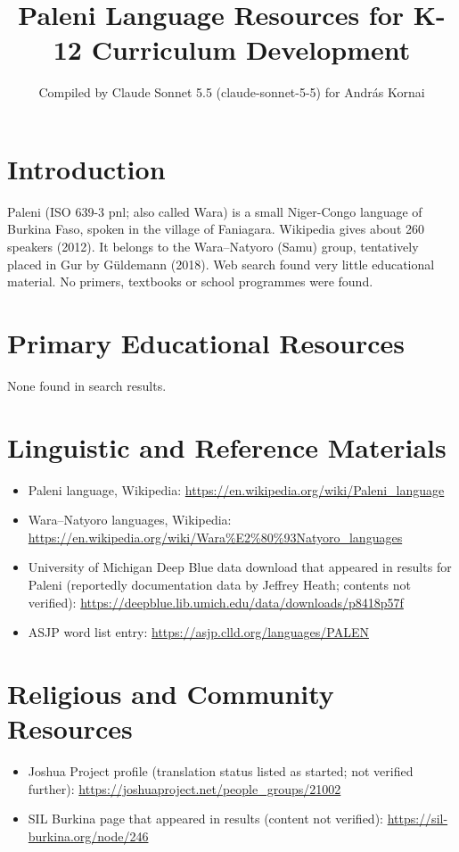 \documentclass[12pt]{article}
\title{Paleni Language Resources for K-12 Curriculum Development}
\author{Compiled by Claude Sonnet 5.5 (claude-sonnet-5-5) for Andr\'as Kornai}
\date{}
\begin{document}
\maketitle

\section{Introduction}
Paleni (ISO 639-3 pnl; also called Wara) is a small Niger-Congo language of Burkina Faso, spoken in the village of Faniagara. Wikipedia gives about 260 speakers (2012). It belongs to the Wara--Natyoro (Samu) group, tentatively placed in Gur by G\"uldemann (2018). Web search found very little educational material. No primers, textbooks or school programmes were found.

\section{Primary Educational Resources}
None found in search results.

\section{Linguistic and Reference Materials}
\begin{itemize}
\item Paleni language, Wikipedia: \url{https://en.wikipedia.org/wiki/Paleni_language}
\item Wara--Natyoro languages, Wikipedia: \url{https://en.wikipedia.org/wiki/Wara%E2%80%93Natyoro_languages}
\item University of Michigan Deep Blue data download that appeared in results for Paleni (reportedly documentation data by Jeffrey Heath; contents not verified): \url{https://deepblue.lib.umich.edu/data/downloads/p8418p57f}
\item ASJP word list entry: \url{https://asjp.clld.org/languages/PALEN}
\end{itemize}

\section{Religious and Community Resources}
\begin{itemize}
\item Joshua Project profile (translation status listed as started; not verified further): \url{https://joshuaproject.net/people_groups/21002}
\item SIL Burkina page that appeared in results (content not verified): \url{https://sil-burkina.org/node/246}
\end{itemize}
\end{document}
